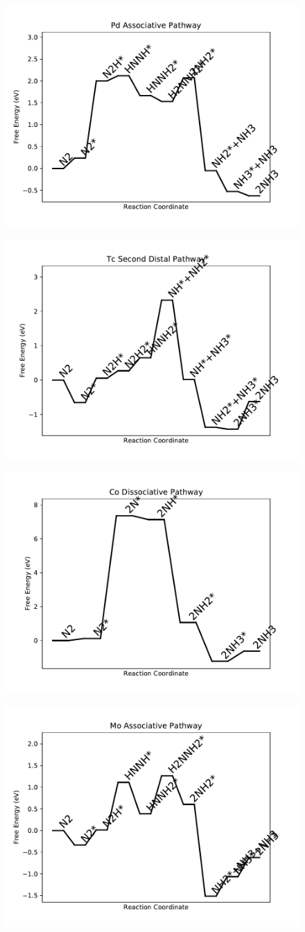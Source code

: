 \documentclass[journal=jacsat,manuscript=article]{achemso}
\begin{document}
\begin{figure}
\includegraphics[width=0.5\linewidth]{data/plots/Pd_associative.pdf}
\label{fig:Pd_associative}
\end{figure}

\newpage
\begin{figure}
\includegraphics[width=0.5\linewidth]{data/plots/Tc_distal_2.pdf}
\label{fig:Tc_distal_2}
\end{figure}

\begin{figure}
\includegraphics[width=0.5\linewidth]{data/plots/Co_dissociative.pdf}
\label{fig:Co_dissociative}
\end{figure}

\newpage
\begin{figure}
\includegraphics[width=0.5\linewidth]{data/plots/Mo_associative.pdf}
\label{fig:Mo_associative}
\end{figure}
\end{document}
